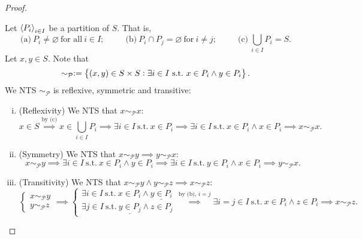 \documentclass[11pt,openany]{article}
\begin{document}
\newpage
{}
\begin{proof}
	\textcolor{gray!30!white}{Let $\left\langle P_i \right\rangle_{i\in I}$ be a partition of $S$. That is, \[
	\text{(a)}\ P_i\neq\varnothing\ \text{for all}\ i\in I;\hspace{30pt}
	\text{(b)}\ P_i\cap P_j=\varnothing\ \text{for}\ i\neq j;\hspace{30pt}
	\text{(c)}\ \bigcup_{i\in I}P_i=S.
	\]
	Let $x,y\in S$. Note that \[
	\sim_{\mathcal{P}}:=\set{(x,y)\in S\times S: \exists i\in I\ \text{s.t.}\ x\in P_i\land y\in P_i}.
	\]We NTS $\sim_{\mathcal{P}}$ is reflexive, symmetric and transitive:
	\begin{enumerate}[(i)]
		\item (Reflexivity) We NTS that $x\sim_{\mathcal{P}} x$: \[
		x\in S\overset{\text{by (c)}}{\implies} x\in \bigcup_{i\in I}P_i\implies \exists i\in I\ \text{s.t.}\ x\in P_i\implies \exists i\in I\ \text{s.t.}\ x\in P_i\land x\in P_i\implies x\sim_{\mathcal{P}} x.
		\]
		\item (Symmetry) We NTS that $x\sim_{\mathcal{P}} y\implies y\sim_{\mathcal{P}} x$:\[
		x\sim_{\mathcal{P}} y\implies \exists i\in I\ \text{s.t.}\ x\in P_i\land y\in P_i\implies \exists i\in I\ \text{s.t.}\ y\in P_i\land x\in P_i\implies y\sim_{\mathcal{P}} x.
		\]
		\item (Transitivity) We NTS that $x\sim_{\mathcal{P}} y\land y\sim_{\mathcal{P}} z\implies x\sim_{\mathcal{P}} z$:\[
		\begin{cases*}
			x\sim_{\mathcal{P}} y \\
			y\sim_{\mathcal{P}} z
		\end{cases*}\implies \begin{cases*}
		\exists i\in I\ \text{s.t.}\ x\in P_i\land \underline{y\in P_i} \\
		\exists j\in I\ \text{s.t.}\ \underline{y\in P_j}\land z\in P_j
	\end{cases*}\overset{\text{by (b), $i=j$}}{\implies}\exists i=j\in I\ \text{s.t.}\ x\in P_i\land z\in P_i\implies x\sim_{\mathcal{P}} z.
		\]
	\end{enumerate}}
\end{proof}
\end{document}
